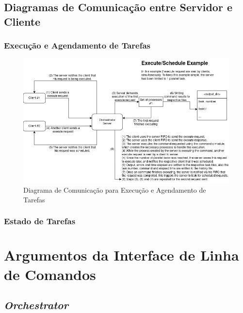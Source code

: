 \documentclass[a4paper,11pt]{scrreprt}
\begin{document}
    \section{Diagramas de Comunicação entre Servidor e Cliente}
        \subsection{Execução e Agendamento de Tarefas}
            \begin{figure}[!ht]
                \centering
                \includegraphics[scale=0.7]{diagrams/execute_schedule.png}
                \caption{Diagrama de Comunicação para Execução e Agendamento de Tarefas}
                \label{fig:3.1}
            \end{figure}
        \subsection{Estado de Tarefas}

\chapter{Argumentos da Interface de Linha de Comandos}
    \section{\textit{Orchestrator}}
\end{document}
